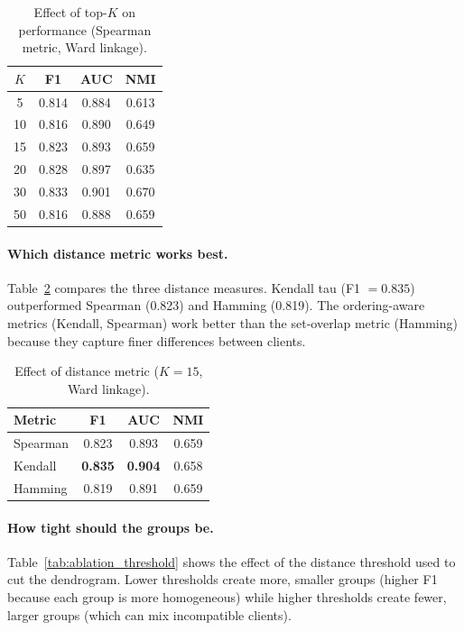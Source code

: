 \documentclass[information,article,submit,pdftex]{mdpi}
\begin{document}
\begin{table}[H]
\caption{Effect of top-$K$ on performance (Spearman metric, Ward
  linkage).}\label{tab:ablation_topk}
\begin{tabular}{cccc}
\toprule
$K$ & \textbf{F1} & \textbf{AUC} & \textbf{NMI} \\
\midrule
5  & 0.814 & 0.884 & 0.613 \\
10 & 0.816 & 0.890 & 0.649 \\
15 & 0.823 & 0.893 & 0.659 \\
20 & 0.828 & 0.897 & 0.635 \\
30 & 0.833 & 0.901 & 0.670 \\
50 & 0.816 & 0.888 & 0.659 \\
\bottomrule
\end{tabular}
\end{table}

\paragraph{Which distance metric works best.} Table~\ref{tab:ablation_metric}
compares the three distance measures. Kendall tau (F1 $= 0.835$) outperformed
Spearman (0.823) and Hamming (0.819). The ordering-aware metrics (Kendall,
Spearman) work better than the set-overlap metric (Hamming) because they capture
finer differences between clients.

\begin{table}[H]
\caption{Effect of distance metric ($K=15$, Ward linkage).}\label{tab:ablation_metric}
\begin{tabular}{lccc}
\toprule
\textbf{Metric} & \textbf{F1} & \textbf{AUC} & \textbf{NMI} \\
\midrule
Spearman & 0.823 & 0.893 & 0.659 \\
Kendall  & \textbf{0.835} & \textbf{0.904} & 0.658 \\
Hamming  & 0.819 & 0.891 & 0.659 \\
\bottomrule
\end{tabular}
\end{table}

\paragraph{How tight should the groups be.}
Table~\ref{tab:ablation_threshold} shows the effect of the distance threshold
used to cut the dendrogram. Lower thresholds create more, smaller groups (higher
F1 because each group is more homogeneous) while higher thresholds create fewer,
larger groups (which can mix incompatible clients).
\end{document}
